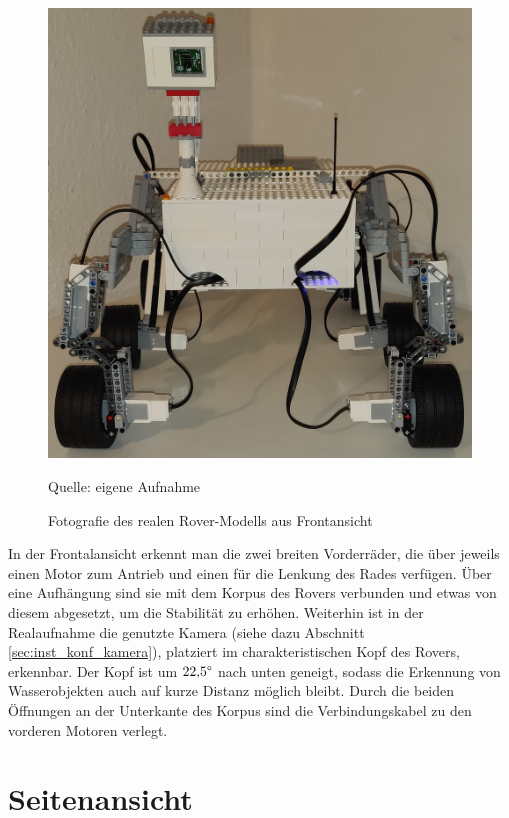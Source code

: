 \begin{figure}
	\centering
	\includegraphics[width=\textwidth]{../Images/20200429_front_01.jpg}
	\vspace{0.5em}
	\parbox[c]{0.8\linewidth}{\footnotesize
		\centering
		\vspace{1em}
		Quelle: eigene Aufnahme
	}
	\caption{Fotografie des realen Rover-Modells aus Frontansicht}
	\label{fig:roverfrontfoto}
\end{figure}

In der Frontalansicht erkennt man die zwei breiten Vorderräder, die über jeweils einen Motor zum Antrieb und einen für die Lenkung des Rades verfügen.
Über eine Aufhängung sind sie mit dem Korpus des Rovers verbunden und etwas von diesem abgesetzt, um die Stabilität zu erhöhen.
Weiterhin ist in der Realaufnahme die genutzte Kamera (siehe dazu Abschnitt \ref{sec:inst_konf_kamera}), platziert im charakteristischen Kopf des Rovers, erkennbar.
Der Kopf ist um $22{,}5 \degree$ nach unten geneigt, sodass die Erkennung von Wasserobjekten auch auf kurze Distanz möglich bleibt.
Durch die beiden Öffnungen an der Unterkante des Korpus sind die Verbindungskabel zu den vorderen Motoren verlegt.

\section{Seitenansicht}
\label{sec:seitenansicht}

